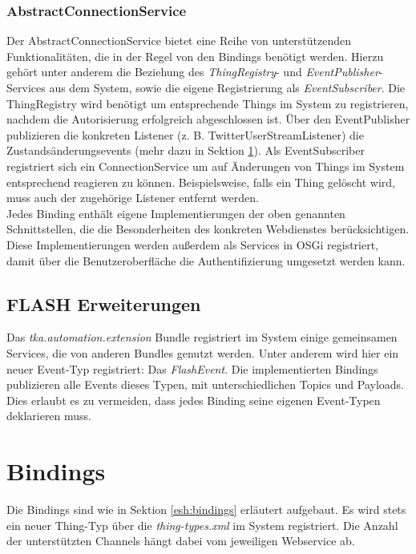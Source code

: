 \subsubsection{AbstractConnectionService}
Der AbstractConnectionService bietet eine Reihe von unterstützenden Funktionalitäten, die in der Regel von den Bindings benötigt werden. Hierzu gehört unter anderem die Beziehung des \textit{ThingRegistry}- und \textit{EventPublisher}-Services aus dem System, sowie die eigene Registrierung als \textit{EventSubscriber}. Die ThingRegistry wird benötigt um entsprechende Things im System zu registrieren, nachdem die Autorisierung erfolgreich abgeschlossen ist. Über den EventPublisher publizieren die konkreten Listener (z. B. TwitterUserStreamListener) die Zustandsänderungsevents (mehr dazu in Sektion \ref{sec:bindings_impl}). Als EventSubscriber registriert sich ein ConnectionService um auf Änderungen von Things im System entsprechend reagieren zu können. Beispielsweise, falls ein Thing gelöscht wird, muss auch der zugehörige Listener entfernt werden.\\



Jedes Binding enthält eigene Implementierungen der oben genannten Schnittstellen, die die Besonderheiten des konkreten Webdienstes berücksichtigen. Diese Implementierungen werden außerdem als Services in OSGi registriert, damit über die Benutzeroberfläche die Authentifizierung umgesetzt werden kann.


\subsection{FLASH Erweiterungen}
Das \textit{tka.automation.extension} Bundle registriert im System einige gemeinsamen Services, die von anderen Bundles genutzt werden. Unter anderem wird hier ein neuer Event-Typ registriert: Das \textit{FlashEvent}. Die implementierten Bindings publizieren alle Events dieses Typen, mit unterschiedlichen Topics und Payloads. Dies erlaubt es zu vermeiden, dass jedes Binding seine eigenen Event-Typen deklarieren muss. 


\section{Bindings}
\label{sec:bindings_impl}
Die Bindings sind wie in Sektion \ref{esh:bindings} erläutert aufgebaut. Es wird stets ein neuer Thing-Typ über die \textit{thing-types.xml} im System registriert. Die Anzahl der unterstützten Channels hängt dabei vom jeweiligen Webservice ab.

